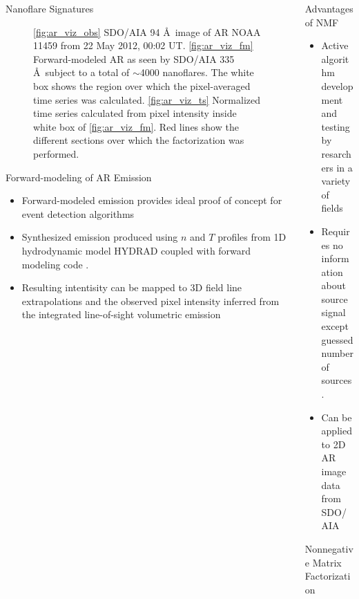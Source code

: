 \documentclass[final]{beamer}
\newcommand{\ang}{\AA~}
\begin{document}
\begin{frame}{}
\begin{columns}[t]
\begin{column}{.32\linewidth}
\begin{block}{Nanoflare Signatures}
\begin{figure}
{				\label{fig:ar_viz_ts}}
				\caption{\footnotesize\ref{fig:ar_viz_obs} SDO/AIA 94 \ang image of AR NOAA 11459 from 22 May 2012, 00:02 UT. \ref{fig:ar_viz_fm} Forward-modeled AR as seen by SDO/AIA 335 \ang subject to a total of $\sim$4000 nanoflares. The white box shows the region over which the pixel-averaged time series was calculated. \ref{fig:ar_viz_ts} Normalized time series calculated from pixel intensity inside white box of \ref{fig:ar_viz_fm}. Red lines show the different sections over which the factorization was performed.}
				\label{fig:ar_viz}
			\end{figure}
		\end{block}
		\begin{block}{Forward-modeling of AR Emission}
			\begin{itemize}
				\item Forward-modeled emission provides \alert{ideal proof of concept} for event detection algorithms
				\item Synthesized emission produced using $n$ and $T$ profiles from 1D hydrodynamic model HYDRAD \citep{bradshaw_influence_2013} coupled with forward modeling code \citep{bradshaw_what_2011,reep_diagnosing_2013}.
				\item Resulting intentisity can be mapped to 3D field line extrapolations \citep[e.g.][]{warren_static_2007} and the observed pixel intensity inferred from the integrated line-of-sight volumetric emission
			\end{itemize}
		\end{block}
      \end{column}
      \begin{column}{.32\linewidth}
  		\begin{block}{Advantages of NMF}
  			\begin{itemize}
  				\item Active algorithm development and testing by resarchers in a variety of fields \citep[e.g. computational neuroscience, see][]{cichocki_nonnegative_2009,soelter_automatic_2014}
  				\item \alert{Requires no information about source signal} except guessed number of sources. 
  				\item Can be applied to 2D AR image data from SDO/AIA
  			\end{itemize}
  		\end{block}
        \begin{block}{Nonnegative Matrix Factorization}

\end{block}
\end{column}
\end{columns}
\end{frame}
\end{document}
